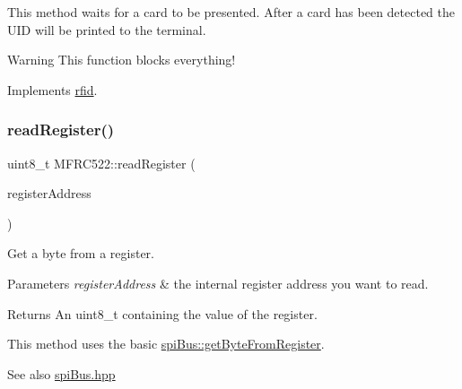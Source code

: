 This method waits for a card to be presented. After a card has been detected the U\+ID will be printed to the terminal. \begin{DoxyWarning}{Warning}
This function blocks everything! 
\end{DoxyWarning}


Implements \mbox{\hyperlink{classrfid_a4efe585f73e584d792347c2891300ad2}{rfid}}.

\mbox{\label{class_m_f_r_c522_afe0e86db047ef36af49349e7fdc7fa65}} 
\subsubsection{\texorpdfstring{read\+Register()}{readRegister()}\hspace{0.1cm}{\footnotesize\ttfamily [1/2]}}
{\footnotesize\ttfamily uint8\+\_\+t M\+F\+R\+C522\+::read\+Register (\begin{DoxyParamCaption}\item[{\mbox{\hyperlink{class_m_f_r_c522_ae7ec09eb8c9c61288a4770175b4b8db7}{R\+EG}}}]{register\+Address }\end{DoxyParamCaption})\hspace{0.3cm}{\ttfamily [protected]}}



Get a byte from a register. 


\begin{DoxyParams}{Parameters}
{\em register\+Address} & the internal register address you want to read. \\
\hline
\end{DoxyParams}
\begin{DoxyReturn}{Returns}
An uint8\+\_\+t containing the value of the register.
\end{DoxyReturn}
This method uses the basic \mbox{\hyperlink{classspi_bus_ab6b195b235dd0a1dad2f7cec3d997ffb}{spi\+Bus\+::get\+Byte\+From\+Register}}. \begin{DoxySeeAlso}{See also}
\mbox{\hyperlink{spi_bus_8hpp_source}{spi\+Bus.\+hpp}} 
\end{DoxySeeAlso}
\mbox{\label{class_m_f_r_c522_a559408e38c2c8fea3316f6e2b4477b81}} 

